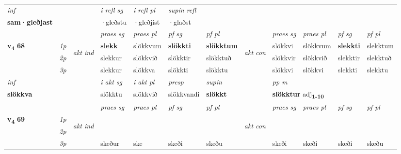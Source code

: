 \begin{longtable}[l]{X>{\footnotesize\itshape}llXXXXlXXXX}
   {\textit{inf}} & &   & \textit{i refl sg} & \textit{i refl pl}   & \textit{supin refl}  \\*
  {\textbf{sam\allowbreak ·gleðjast}} & &   & ·gleðstu & ·gleðjist   & ·glaðst  \\*

\midrule

 & &   & \textit{praes sg}  & \textit{praes pl}    & \textit{ pf sg} & \textit{pf pl} & & \textit{praes sg}  & \textit{praes pl}    & \textit{pf sg} & \textit{pf pl }  \\ \cmidrule{4-7} \cmidrule{9-12}
 \multirow{2}{*}{{{\textbf{v{\textsubscript{4}}} \Large{\textbf{68}}}}}  & 1p & \multirow{3}{*}{\begin{turn}{90}\textit{akt ind}\end{turn}} & \textbf{slekk} & slökkvum & \textbf{slökkti} & \textbf{slökktum} & \multirow{3}{*}{\begin{turn}{90}\textit{akt con}\end{turn}} &slökkvi & slökkvum & \textbf{slekkti} & slekktum\\*
 & 2p &  &  slekkur  & slökkvið & slökktir & slökktuð & & slökkvir & slökkvið & slekktir & slekktuð \\*
 & 3p &  & slekkur & slökkva & slökkti & slökktu & & slökkvi & slökkvi& slekkti & slekktu \\*
\cmidrule{4-7} \cmidrule{9-12}

   {\textit{inf}} & &  & \textit{i akt sg} & \textit{i akt pl}   & \textit{presp} & \textit{supin}  && \textit{pp m} \\*
  {\textbf{slökkva}} & && slökktu  & slökkvið   & slökkvandi &  \textbf{slökkt}  && \multicolumn{2}{l}{\textbf{slökktur} adj\textbf{\textsubscript{1-10}}} \\*

\midrule

 & &   & \textit{praes sg}  & \textit{praes pl}    & \textit{ pf sg} & \textit{pf pl} & & \textit{praes sg}  & \textit{praes pl}    & \textit{pf sg} & \textit{pf pl }  \\ \cmidrule{4-7} \cmidrule{9-12}
 \multirow{2}{*}{{{\textbf{v{\textsubscript{4}}} \Large{\textbf{69}}}}}  & 1p & \multirow{3}{*}{\begin{turn}{90}\textit{akt ind}\end{turn}} & \textbf{} &  & \textbf{} & \textbf{} & \multirow{3}{*}{\begin{turn}{90}\textit{akt con}\end{turn}} & &  & \textbf{} & \\*
 & 2p &  &    &  &  &  & &  &  &  &  \\*
 & 3p &  & skeður & ske & skeði & skeðu & & skeði & skeði& skeði & skeðu \\*
\cmidrule{4-7} \cmidrule{9-12}


\end{longtable}
